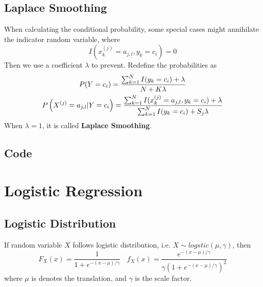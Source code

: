 \documentclass[12pt]{article}
\begin{document}
\subsection{Laplace Smoothing}
When calculating the conditional probability, some special cases might annihilate the indicator random variable, where
\begin{equation}
    I(x_k^{(j)} = a_{j,l},y_k = c_i) = 0
\end{equation}
Then we use a coefficient  $\lambda$ to prevent. Redefine the probabilities as
\begin{gather}
    P(Y = c_i) = \frac{\sum_{k=1}^N I(y_k = c_i) + \lambda}{N + K \lambda} \notag \\
    P\left(X^{(j)} = a_{j,l}|Y = c_i \right) = \frac{\sum_{k=1}^N I(x_k^{(j)} = a_{j,l}, y_k = c_i) + \lambda}{\sum_{k=1}^N I(y_k = c_i) + S_j \lambda}
\end{gather}
When $\lambda = 1$, it is called \textbf{Laplace Smoothing}.
\subsection{Code}

\section{Logistic Regression}
\subsection{Logistic Distribution}
If random variable $X$ follows logistic distribution, i.e. $X \sim logstic(\mu, \gamma)$, then
\begin{equation}
    F_X(x) = \frac{1}{1 + e^{-(x-\mu)/\gamma }}~~~~f_X(x) = \frac{e^{-(x - \mu) / \gamma}}{\gamma(1 + e^{-(x - \mu)/\gamma})^2}
\end{equation}
where $\mu$ is denotes the translation, and $\gamma$ is the scale factor.
\end{document}
